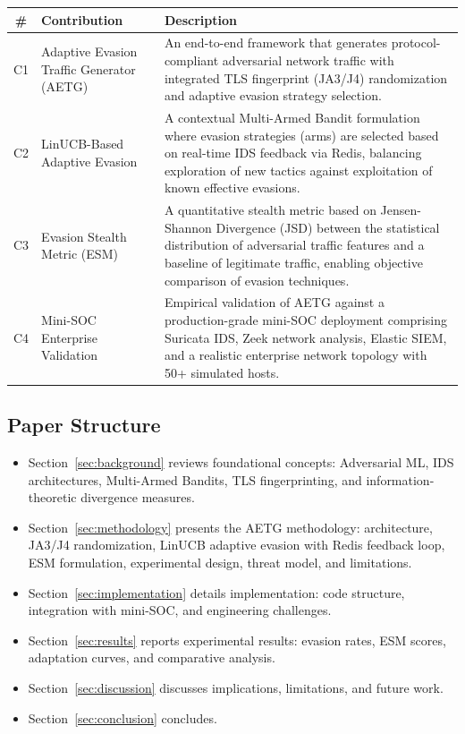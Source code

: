 \documentclass[review]{elsarticle}
\begin{document}
\begin{table}[htbp]
\small
\centering
\renewcommand{\arraystretch}{1.2}
\begin{tabular}{|c|p{2.5cm}|p{7cm}|}
\hline
\textbf{\#} & \textbf{Contribution} & \textbf{Description} \\
\hline
C1 & Adaptive Evasion Traffic Generator (AETG) & An end-to-end framework that generates protocol-compliant adversarial network traffic with integrated TLS fingerprint (JA3/J4) randomization and adaptive evasion strategy selection. \\
\hline
C2 & LinUCB-Based Adaptive Evasion & A contextual Multi-Armed Bandit formulation where evasion strategies (arms) are selected based on real-time IDS feedback via Redis, balancing exploration of new tactics against exploitation of known effective evasions. \\
\hline
C3 & Evasion Stealth Metric (ESM) & A quantitative stealth metric based on Jensen-Shannon Divergence (JSD) between the statistical distribution of adversarial traffic features and a baseline of legitimate traffic, enabling objective comparison of evasion techniques. \\
\hline
C4 & Mini-SOC Enterprise Validation & Empirical validation of AETG against a production-grade mini-SOC deployment comprising Suricata IDS, Zeek network analysis, Elastic SIEM, and a realistic enterprise network topology with 50+ simulated hosts. \\
\hline
\end{tabular}
\end{table}

\subsection{Paper Structure}
\begin{itemize}
\item Section~\ref{sec:background} reviews foundational concepts: Adversarial ML, IDS architectures, Multi-Armed Bandits, TLS fingerprinting, and information-theoretic divergence measures.
\item Section~\ref{sec:methodology} presents the AETG methodology: architecture, JA3/J4 randomization, LinUCB adaptive evasion with Redis feedback loop, ESM formulation, experimental design, threat model, and limitations.
\item Section~\ref{sec:implementation} details implementation: code structure, integration with mini-SOC, and engineering challenges.
\item Section~\ref{sec:results} reports experimental results: evasion rates, ESM scores, adaptation curves, and comparative analysis.
\item Section~\ref{sec:discussion} discusses implications, limitations, and future work.
\item Section~\ref{sec:conclusion} concludes.
\end{itemize}
\end{document}
